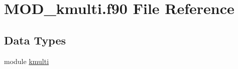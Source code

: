 \hypertarget{MOD__kmulti_8f90}{\section{M\-O\-D\-\_\-kmulti.\-f90 File Reference}
\label{MOD__kmulti_8f90}
}
\subsection*{Data Types}
\begin{DoxyCompactItemize}
\item 
module \hyperlink{classkmulti}{kmulti}
\end{DoxyCompactItemize}
